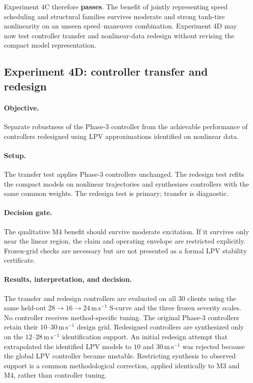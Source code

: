 Experiment 4C therefore \textbf{passes}. The benefit of jointly representing
speed scheduling and structural families survives moderate and strong tanh-tire
nonlinearity on an unseen speed--maneuver combination. Experiment 4D may now test
controller transfer and nonlinear-data redesign without revising the compact
model representation.

\clearpage

\subsection{Experiment 4D: controller transfer and redesign}
\label{sec:experiment4d}
\paragraph{Objective.}
Separate robustness of the Phase-3 controller from the achievable performance of
controllers redesigned using LPV approximations identified on nonlinear data.

\paragraph{Setup.}
The transfer test applies Phase-3 controllers unchanged. The redesign test refits
the compact models on nonlinear trajectories and synthesizes controllers with the
same common weights. The redesign test is primary; transfer is diagnostic.

\paragraph{Decision gate.}
The qualitative M4 benefit should survive moderate excitation. If it survives only
near the linear region, the claim and operating envelope are restricted
explicitly. Frozen-grid checks are necessary but are not presented as a formal LPV
stability certificate.

\paragraph{Results, interpretation, and decision.}
The transfer and redesign controllers are evaluated on all 30 clients using the
same held-out $28\rightarrow16\rightarrow24\,\mathrm{m\,s^{-1}}$ S-curve and
the three frozen severity scales. No controller receives method-specific tuning.
The original Phase-3 controllers retain their $10$--$30\,\mathrm{m\,s^{-1}}$
design grid. Redesigned controllers are synthesized only on the
$12$--$28\,\mathrm{m\,s^{-1}}$ identification support. An initial redesign
attempt that extrapolated the identified LPV models to $10$ and
$30\,\mathrm{m\,s^{-1}}$ was rejected because the global LPV controller became
unstable. Restricting synthesis to observed support is a common methodological
correction, applied identically to M3 and M4, rather than controller tuning.

